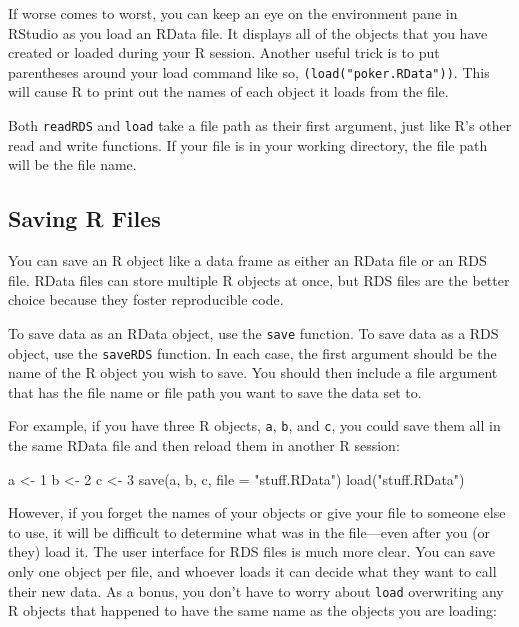 \documentclass[
  letterpaper,
  DIV=11,
  numbers=noendperiod]{scrbook}
\newenvironment{Shaded}{\begin{snugshade}}{\end{snugshade}}
\newcommand{\AttributeTok}[1]{\textcolor[rgb]{0.40,0.45,0.13}{#1}}
\newcommand{\DecValTok}[1]{\textcolor[rgb]{0.68,0.00,0.00}{#1}}
\newcommand{\FunctionTok}[1]{\textcolor[rgb]{0.28,0.35,0.67}{#1}}
\newcommand{\NormalTok}[1]{\textcolor[rgb]{0.00,0.23,0.31}{#1}}
\newcommand{\OtherTok}[1]{\textcolor[rgb]{0.00,0.23,0.31}{#1}}
\newcommand{\StringTok}[1]{\textcolor[rgb]{0.13,0.47,0.30}{#1}}
\begin{document}
If worse comes to worst, you can keep an eye on the environment pane in
RStudio as you load an RData file. It displays all of the objects that
you have created or loaded during your R session. Another useful trick
is to put parentheses around your load command like so,
\texttt{(load("poker.RData"))}. This will cause R to print out the names
of each object it loads from the file.

Both \texttt{readRDS} and \texttt{load} take a file path as their first
argument, just like R's other read and write functions. If your file is
in your working directory, the file path will be the file name.

\subsection{Saving R Files}\label{saving-r-files}

You can save an R object like a data frame as either an RData file or an
RDS file. RData files can store multiple R objects at once, but RDS
files are the better choice because they foster reproducible code.

To save data as an RData object, use the \texttt{save} function. To save
data as a RDS object, use the \texttt{saveRDS} function. In each case,
the first argument should be the name of the R object you wish to save.
You should then include a file argument that has the file name or file
path you want to save the data set to.

For example, if you have three R objects, \texttt{a}, \texttt{b}, and
\texttt{c}, you could save them all in the same RData file and then
reload them in another R session:

\begin{Shaded}
\begin{Highlighting}[]
\NormalTok{a }\OtherTok{\textless{}{-}} \DecValTok{1}
\NormalTok{b }\OtherTok{\textless{}{-}} \DecValTok{2}
\NormalTok{c }\OtherTok{\textless{}{-}} \DecValTok{3}
\FunctionTok{save}\NormalTok{(a, b, c, }\AttributeTok{file =} \StringTok{"stuff.RData"}\NormalTok{)}
\FunctionTok{load}\NormalTok{(}\StringTok{"stuff.RData"}\NormalTok{)}
\end{Highlighting}
\end{Shaded}

However, if you forget the names of your objects or give your file to
someone else to use, it will be difficult to determine what was in the
file---even after you (or they) load it. The user interface for RDS
files is much more clear. You can save only one object per file, and
whoever loads it can decide what they want to call their new data. As a
bonus, you don't have to worry about \texttt{load} overwriting any R
objects that happened to have the same name as the objects you are
loading:
\end{document}
